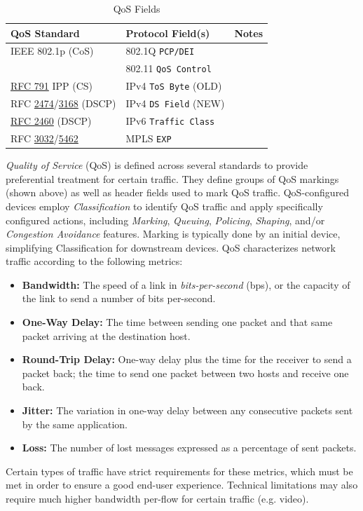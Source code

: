 \documentclass[12pt]{article}
\newcommand{\rfc}[1]{\href{https://datatracker.ietf.org/doc/html/rfc#1}{#1}}
\newcommand{\RFC}[1]{\href{https://datatracker.ietf.org/doc/html/rfc#1}{RFC #1}}
\newcommand{\mr}[2]{\multirow{#1}{*}{#2}}
\begin{document}
	\begin{table}[H]
	\centering
	\caption{QoS Fields \label{tab:QOS FIELDS}}
	\begin{tabular}{@{} l l r @{}}\hline
	\textbf{QoS Standard} 			& \textbf{Protocol Field(s)}		& \textbf{Notes}\\\hline
	IEEE 802.1p (CoS)				& 802.1Q \texttt{PCP/DEI} 		& \Cref{tab:802.1Q}\\\hline
							& 802.11 \texttt{QoS Control} 		& \Cref{subsec:802.11 WLANS}\\\hline
	\RFC{791} IPP (CS)			& IPv4 \texttt{ToS Byte} (OLD) 	& \mr{2}{\Cref{subsec:IPV4}}\\
	RFC \rfc{2474}/\rfc{3168} (DSCP)	& IPv4 \texttt{DS Field} (NEW) 	&\\\hline
	\RFC{2460} (DSCP)			& IPv6 \texttt{Traffic Class} 		& \Cref{subsec:IPV6}\\\hline
	RFC \rfc{3032}/\rfc{5462}		& MPLS \texttt{EXP}			& \Cref{sec:MPLS}\\\hline
	\end{tabular}\end{table}
	\textit{Quality of Service} (QoS) is defined across several standards to provide preferential treatment for certain traffic. They define groups of QoS markings (shown above) as well as header fields used to mark QoS traffic. QoS-configured devices employ \textit{Classification} to identify QoS traffic and apply specifically configured actions, including \textit{Marking}, \textit{Queuing}, \textit{Policing}, \textit{Shaping}, and/or \textit{Congestion Avoidance} features. Marking is typically done by an initial device, simplifying Classification for downstream devices. QoS characterizes network traffic according to the following metrics:

	\begin{itemize}[leftmargin=*, label=]
		\label{itm:QOS METRICS}
		\item{\textbf{Bandwidth:} The speed of a link in \textit{bits-per-second} (bps), or the capacity of the link to send a number of bits per-second.}
		\item{\textbf{One-Way Delay:} The time between sending one packet and that same packet arriving at the destination host.}
		\item{\textbf{Round-Trip Delay:} One-way delay plus the time for the receiver to send a packet back; the time to send one packet between two hosts and receive 					one back.}
		\item{\textbf{Jitter:} The variation in one-way delay between any consecutive packets sent by the same application.}
		\item{\textbf{Loss:} The number of lost messages expressed as a percentage of sent packets.}
	\end{itemize}
	Certain types of traffic have strict requirements for these metrics, which must be met in order to ensure a good end-user experience. Technical limitations may also require much higher bandwidth per-flow for certain traffic (e.g. video).
	
\end{document}
